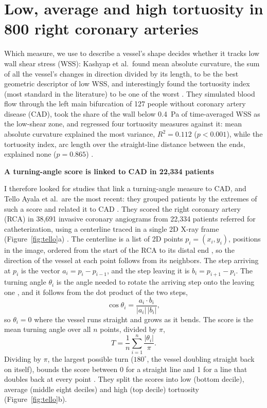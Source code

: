 \section{Low, average and high tortuosity in 800 right coronary arteries}

\medskip


\noindent Which measure, we use to describe a vessel's shape decides whether it tracks low wall shear stress
(WSS): Kashyap et al.\ found mean absolute curvature, the sum of all the vessel's changes in
direction divided by its length, to be the best geometric descriptor of low WSS, and interestingly found the tortuosity index (most standard in the literature) to be one of the worst
\cite{kashyap2022tortuosity}.
They simulated blood flow through the left main bifurcation of 127 people without coronary artery
disease (CAD), took the share of the wall below 0.4~Pa of time-averaged WSS as the low-shear zone,
and regressed four tortuosity measures against it: mean absolute curvature explained the most
variance, $R^2 = 0.112$ ($p < 0.001$), while the tortuosity index, arc length over the
straight-line distance between the ends, explained none ($p = 0.865$) \cite{kashyap2022tortuosity}.


\medskip
\noindent \textbf{A turning-angle score is linked to CAD in 22,334 patients}


\noindent I therefore looked for studies that link a turning-angle measure to CAD, and Tello Ayala
et al.\ are the most recent: they grouped patients by the extremes of such a score and related it
to CAD \cite{telloayala2026tortuosity}.
They scored the right coronary artery (RCA) in 38,691 invasive coronary angiograms from 22,334
patients referred for catheterization, using a centerline traced in a single 2D X-ray frame
(Figure~\ref{fig:tello}a) \cite{telloayala2026tortuosity}.
The centerline is a list of 2D points $p_i = (x_i, y_i)$, positions in the image, ordered from the
start of the RCA to its distal end \cite{telloayala2026tortuosity}, so the direction of the vessel at each
point follows from its neighbors.
The step arriving at $p_i$ is the vector $a_i = p_i - p_{i-1}$, and the step leaving it is
$b_i = p_{i+1} - p_i$.
The turning angle $\theta_i$ is the angle needed to rotate the arriving step onto the leaving one
\cite{telloayala2026tortuosity}, and it follows from the dot product of the two steps,
\begin{equation}
  \cos\theta_i = \frac{a_i \cdot b_i}{\lvert a_i\rvert\,\lvert b_i\rvert},
  \label{eq:turn}
\end{equation}
so $\theta_i = 0$ where the vessel runs straight and grows as it bends.
The score is the mean turning angle over all $n$ points, divided by $\pi$,
\begin{equation}
  T = \frac{1}{n}\sum_{i=1}^{n} \frac{\lvert\theta_i\rvert}{\pi}.
  \label{eq:tello}
\end{equation}
Dividing by $\pi$, the largest possible turn ($180^\circ$, the vessel doubling straight back on itself),
bounds the score between 0 for a straight line and 1 for a line that doubles back at every point
\cite{telloayala2026tortuosity}.
They split the scores into low (bottom decile), average (middle eight deciles) and high (top
decile) tortuosity (Figure~\ref{fig:tello}b).

